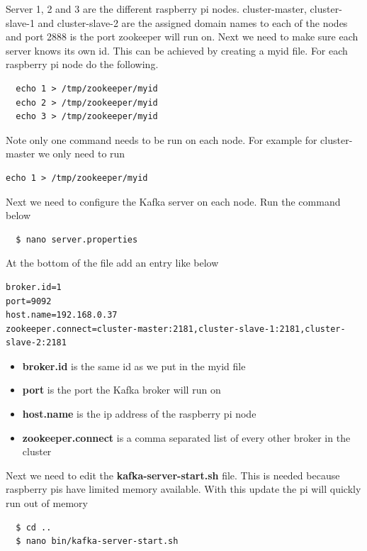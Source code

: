 Server 1, 2 and 3 are the different raspberry pi nodes. cluster-master, cluster-slave-1 and cluster-slave-2 are the assigned domain names to each of the nodes and port 2888 is the port zookeeper will run on. Next we need to make sure each server knows its own id. This can be achieved by creating a myid file. For each raspberry pi node do the following. 

\begin{verbatim}
  echo 1 > /tmp/zookeeper/myid
  echo 2 > /tmp/zookeeper/myid
  echo 3 > /tmp/zookeeper/myid
\end{verbatim}

Note only one command needs to be run on each node. For example for cluster-master we only need to run 

\begin{verbatim}
echo 1 > /tmp/zookeeper/myid
\end{verbatim}

Next we need to configure the Kafka server on each node. Run the command below

\begin{verbatim}
  $ nano server.properties
\end{verbatim}

At the bottom of the file add an entry like below

\begin{verbatim}
broker.id=1
port=9092
host.name=192.168.0.37
zookeeper.connect=cluster-master:2181,cluster-slave-1:2181,cluster-slave-2:2181
\end{verbatim}

\begin{itemize}
  \item \textbf{broker.id} is the same id as we put in the myid file
  \item \textbf{port} is the port the Kafka broker will run on
  \item \textbf{host.name} is the ip address of the raspberry pi node
  \item \textbf{zookeeper.connect} is a comma separated list of every other broker in the cluster
\end{itemize}

Next we need to edit the \textbf{kafka-server-start.sh} file. This is needed because raspberry pis have limited memory available. With this update the pi will quickly run out of memory \cite{raspberry:pi}

\begin{verbatim}
  $ cd ..
  $ nano bin/kafka-server-start.sh
\end{verbatim}

